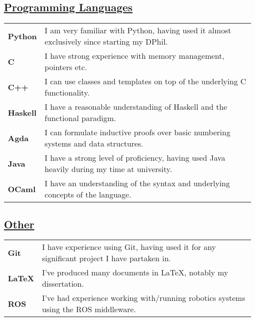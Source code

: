 \documentclass[11pt]{article}
\begin{document}
		\subsection*{\underline{Programming Languages}}
		\renewcommand{\arraystretch}{1.3}%
		\begin{tabular}[20pt]{ll}
		        \textbf{Python} & I am very familiar with Python, having used it almost exclusively since starting my DPhil. \\
			\textbf{C} & I have strong experience with memory management, pointers etc. \\
			\textbf{C++} & I can use classes and templates on top of the underlying C functionality. \\
			\textbf{Haskell} & I have a reasonable understanding of Haskell and the functional paradigm.\\
			\textbf{Agda} & I can formulate inductive proofs over basic numbering systems and data structures.\\
			 \textbf{Java} &  I have a strong level of proficiency, having used Java heavily during my time at university.\\
			 \textbf{OCaml} & I have an understanding of the syntax and underlying concepts of the language.\\
		\end{tabular} 
		\subsection*{\underline{Other}}
		\renewcommand{\arraystretch}{1.3}%
		\begin{tabular}{ll}
			 \textbf{Git} & I have experience using Git, having used it for any significant project I have partaken in.\\
			\textbf{LaTeX} & I've produced many documents in LaTeX, notably my dissertation.\\
			\textbf{ROS} & I've had experience working with/running robotics systems using the ROS middleware.
		\end{tabular}
\fi
\end{document}
